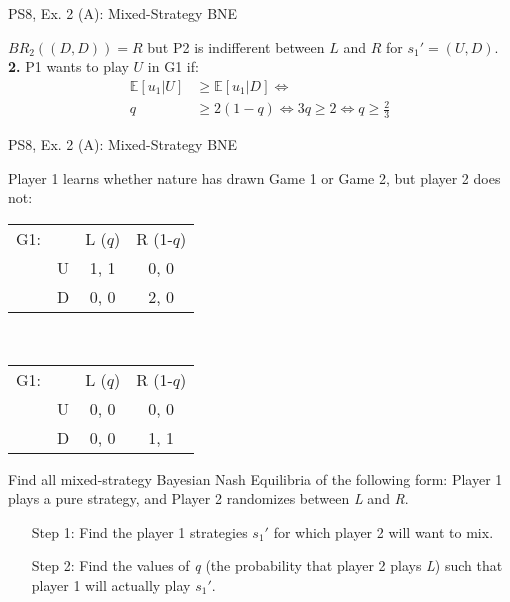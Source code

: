 \begin{frame}{PS8, Ex. 2 (A): Mixed-Strategy BNE}
\begin{multicols}{2}
      $BR_2((D,D))=R$ but P2 is indifferent between $L$ and $R$ for $s_1'=(U,D)$.\\\medskip
      \textbf{2.} P1 wants to play $U$ in G1 if:
      \begin{align*}
        \mathbb{E}[u_1|U]&\geq \mathbb{E}[u_1|D]\Leftrightarrow\\
        q&\geq2(1-q)\Leftrightarrow 3q\geq2 \Leftrightarrow q\geq\frac{2}{3}
      \end{align*}
      \vfill\null
    \end{multicols}
\end{frame}
\begin{frame}{PS8, Ex. 2 (A): Mixed-Strategy BNE}
    \begin{multicols}{2}
      Player 1 learns whether nature has drawn Game 1 or Game 2, but player 2 does not:
      \begin{table}
        \begin{tabular}{ll|c|c|}
          \multicolumn{1}{c}{G1:} & \multicolumn{1}{c}{} & \multicolumn{1}{c}{L ($q$)} & \multicolumn{1}{c}{R (1-$q$)} \\\cline{3-4}
          & U & 1, 1 & 0, 0 \\\cline{3-4}
          & D & 0, 0 & 2, 0 \\\cline{3-4}
        \end{tabular}\\\medskip
        \begin{tabular}{ll|c|c|}
          \multicolumn{1}{c}{G1:} & \multicolumn{1}{c}{} & \multicolumn{1}{c}{L ($q$)} & \multicolumn{1}{c}{R (1-$q$)} \\\cline{3-4}
          & U & 0, 0 & 0, 0 \\\cline{3-4}
          & D & 0, 0 & 1, 1 \\\cline{3-4}
        \end{tabular}
      \end{table}
      \vspace{-4pt}
      Find all mixed-strategy Bayesian Nash Equilibria of the following form: Player 1 plays a pure strategy, and Player 2 randomizes between \textit{L} and \textit{R}.
      \vspace{-4pt}
      \begin{itemize}
        \item[Step 1:] Find the player 1 strategies $s_1'$ for which player 2 will want to mix.
        \item[Step 2:] Find the values of \textit{q} (the probability that player 2 plays \textit{L}) such that player 1 will actually play $s_1'$.

\end{itemize}
\end{multicols}
\end{frame}
